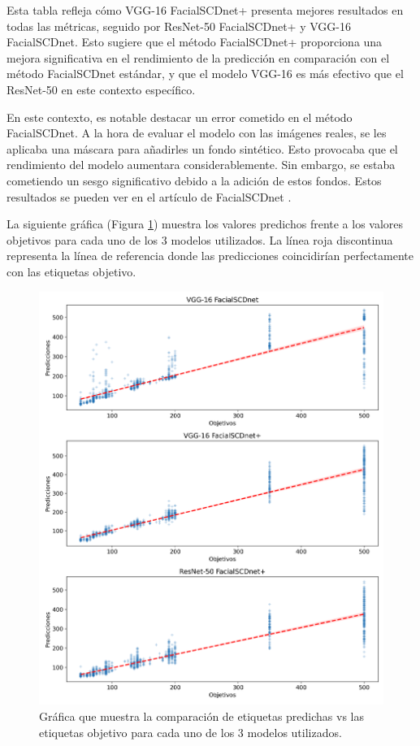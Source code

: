 Esta tabla refleja cómo VGG-16 FacialSCDnet+ presenta mejores resultados en todas las métricas, seguido por ResNet-50 FacialSCDnet+ y VGG-16 FacialSCDnet. Esto sugiere que el método FacialSCDnet+ proporciona una mejora significativa en el rendimiento de la predicción en comparación con el método FacialSCDnet estándar, y que el modelo VGG-16 es más efectivo que el ResNet-50 en este contexto específico.

En este contexto, es notable destacar un error cometido en el método FacialSCDnet. A la hora de evaluar el modelo con las imágenes reales, se les aplicaba una máscara para añadirles un fondo sintético. Esto provocaba que el rendimiento del modelo aumentara considerablemente. Sin embargo, se estaba cometiendo un sesgo significativo debido a la adición de estos fondos. Estos resultados se pueden ver en el artículo de FacialSCDnet \cite{14}.

La siguiente gráfica (Figura \ref{fig34}) muestra los valores predichos frente a los valores objetivos para cada uno de los 3 modelos utilizados. La línea roja discontinua representa la línea de referencia donde las predicciones coincidirían perfectamente con las etiquetas objetivo. 

\begin{figure}[h]
	\centering
	\includegraphics[width=\textwidth]{imagenes/cap5/comp_etiquetas_real.png}
	\caption[Comparación etiquetas test FacialSCDnet.]{Gráfica que muestra la comparación de etiquetas predichas vs las etiquetas objetivo para cada uno de los 3 modelos utilizados.}
	\label{fig34}
\end{figure}

